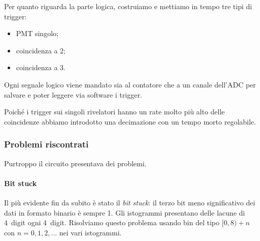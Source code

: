 Per quanto riguarda la parte logica, costruiamo e mettiamo in tempo tre tipi di trigger:
\begin{itemize}
	\item PMT singolo;
	\item coincidenza a 2;
	\item coincidenza a 3.
\end{itemize}
Ogni segnale logico viene mandato sia al contatore che a un canale dell'ADC
per salvare e poter leggere via software i trigger.


Poiché i trigger sui singoli rivelatori hanno un rate molto più alto delle coincidenze
abbiamo introdotto una decimazione con un tempo morto regolabile.

\subsubsection{Problemi riscontrati}

Purtroppo il circuito presentava dei problemi.

\paragraph{Bit stuck}

Il più evidente fin da subito è stato il \emph{bit stuck}: il terzo bit meno significativo dei dati in formato binario è sempre 1.
Gli istogrammi presentano delle lacune di \SI{4}{digit} ogni \SI{4}{digit}. Risolviamo questo problema usando bin del tipo $[0,8)+n$ con  $n=0,1,2,\dots$ nei vari istogrammi.

